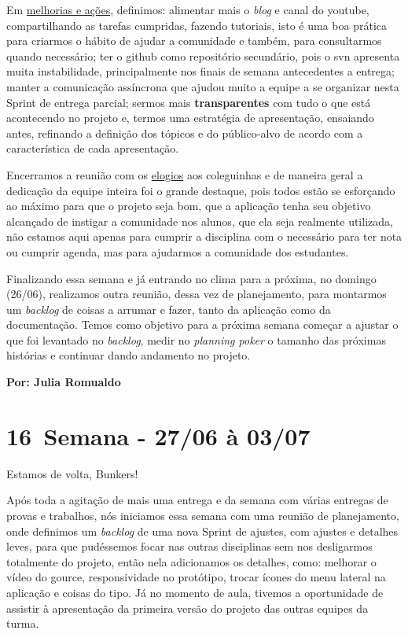 Em \underline{melhorias e ações}, definimos: alimentar mais o \textit{blog} e canal do \gls{youtube}, compartilhando as tarefas cumpridas, fazendo tutoriais, isto é uma boa prática para criarmos o hábito de ajudar a comunidade e também, para consultarmos quando necessário; ter o \gls{github} como repositório secundário, pois o \acs{svn} apresenta muita instabilidade, principalmente nos finais de semana antecedentes a entrega; manter a comunicação assíncrona que ajudou muito a equipe a se organizar nesta \gls{Sprint} de entrega parcial; sermos mais \textbf{transparentes} com tudo o que está acontecendo no projeto e, termos uma estratégia de apresentação, ensaiando antes, refinando a definição dos tópicos e do público-alvo de acordo com a característica de cada apresentação.

Encerramos a reunião com os \underline{elogios} aos coleguinhas e de maneira geral a dedicação da equipe inteira foi o grande destaque, pois todos estão se esforçando ao máximo para que o projeto seja bom, que a aplicação tenha seu objetivo alcançado de instigar a comunidade nos alunos, que ela seja realmente utilizada, não estamos aqui apenas para cumprir a disciplina com o necessário para ter nota ou cumprir agenda, mas para ajudarmos a comunidade dos estudantes.

Finalizando essa semana e já entrando no clima para a próxima, no domingo (26/06), realizamos outra reunião, dessa vez de planejamento, para montarmos um \textit{backlog} de coisas a arrumar e fazer, tanto da aplicação como da documentação. Temos como objetivo para a próxima semana começar a ajustar o que foi levantado no \textit{backlog}, medir no \textit{planning poker} o tamanho das próximas histórias e continuar dando andamento no projeto. 

\textbf{Por: Julia Romualdo}

\section{16\textordfeminine \, Semana - 27/06 à 03/07}
Estamos de volta, Bunkers!

Após toda a agitação de mais uma entrega e da semana com várias entregas de provas e trabalhos, nós iniciamos essa semana com uma reunião de planejamento, onde definimos um \textit{backlog} de uma nova \gls{Sprint} de ajustes, com ajustes e detalhes leves, para que pudéssemos focar nas outras disciplinas sem nos desligarmos totalmente do projeto, então nela adicionamos os detalhes, como: melhorar o vídeo do \gls{gource}, responsividade no protótipo, trocar ícones do menu lateral na aplicação e coisas do tipo. Já no momento de aula, tivemos a oportunidade de assistir à apresentação da primeira versão do projeto das outras equipes da turma. 

